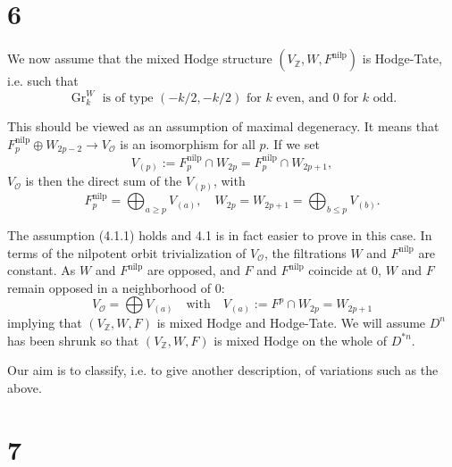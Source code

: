 \documentclass[11pt,a4paper]{article}
\theoremstyle{plain}
\theoremstyle{definition}
\DeclareMathOperator{\Gr}{Gr}
\begin{document}
\section{6}

We now assume that the mixed Hodge structure $(V_{\mathbb{Z}}, W, F^{\text{nilp}})$ is Hodge-Tate, i.e. such that
\begin{equation}
\Gr_{k}^{W} \text{ is of type } (-k/2, -k/2) \text{ for } k \text{ even, and } 0 \text{ for } k \text{ odd.} \tag{6.1}
\end{equation}

This should be viewed as an assumption of maximal degeneracy. It means that $F^{\text{nilp}}_{p} \oplus W_{2p-2} \to V_{\mathcal{O}}$ is an isomorphism for all $p$. If we set
\[
V_{(p)} := F^{\text{nilp}}_{p} \cap W_{2p} = F^{\text{nilp}}_{p} \cap W_{2p+1},
\]
$V_{\mathcal{O}}$ is then the direct sum of the $V_{(p)}$, with
\[
F^{\text{nilp}}_{p} = \bigoplus_{a \geq p} V_{(a)}, \quad W_{2p} = W_{2p+1} = \bigoplus_{b \leq p} V_{(b)}.
\]

The assumption (4.1.1) holds and 4.1 is in fact easier to prove in this case. In terms of the nilpotent orbit trivialization of $V_{\mathcal{O}}$, the filtrations $W$ and $F^{\text{nilp}}$ are constant. As $W$ and $F^{\text{nilp}}$ are opposed, and $F$ and $F^{\text{nilp}}$ coincide at 0, $W$ and $F$ remain opposed in a neighborhood of 0:
\begin{equation}
V_{\mathcal{O}} = \bigoplus V_{(a)} \quad \text{with} \quad V_{(a)} := F^{p} \cap W_{2p} = W_{2p+1} \tag{6.2}
\end{equation}
implying that $(V_{\mathbb{Z}}, W, F)$ is mixed Hodge and Hodge-Tate. We will assume $D^{n}$ has been shrunk so that $(V_{\mathbb{Z}}, W, F)$ is mixed Hodge on the whole of $D^{*n}$.

Our aim is to classify, i.e. to give another description, of variations such as the above.

\section{7}
\end{document}
